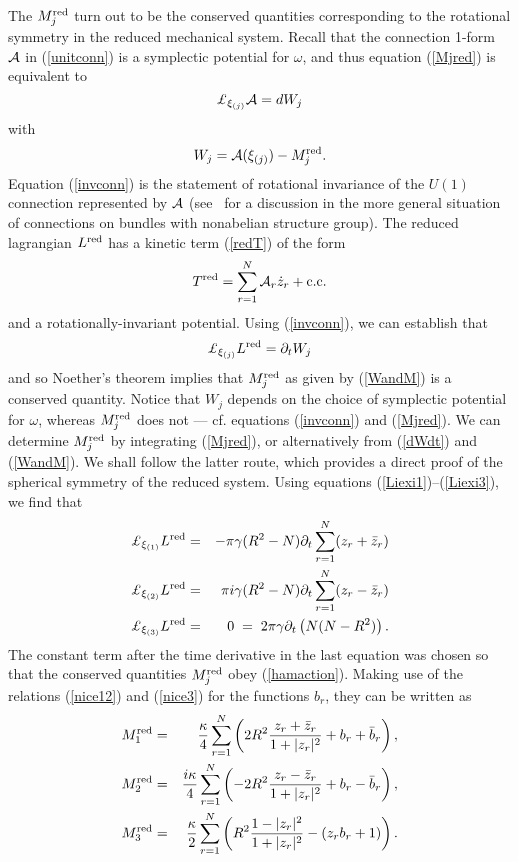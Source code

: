 \documentclass[a4paper,11pt]{article}
\begin{document}
The $M_{j}^{\rm red}$ turn out to be the conserved quantities
corresponding to the rotational symmetry in the reduced mechanical
system. Recall that the connection 1-form $\cal A$
in (\ref{unitconn}) is a symplectic potential for $\omega$, and thus
equation (\ref{Mjred}) is equivalent to 
\begin{equation}\label{invconn}
{\rm \pounds}_{\xi_{(j)}}{\cal A}=dW_{j}
\end{equation}
with
\begin{equation} \label{WandM}
W_{j}={\cal A}(\xi_{(j)})-M^{\rm red}_{j}.
\end{equation}
Equation (\ref{invconn}) is the statement of rotational invariance of
the $U(1)$ connection represented by ${\cal A}$
(see~\cite{JM} for a discussion
in the more general situation of connections on bundles with
nonabelian structure group). The reduced lagrangian $L^{\rm red}$ 
has a kinetic term (\ref{redT}) of the form
\[
T^{\rm red}=\sum_{r=1}^{N}{\cal A}_{r}\dot{z}_{r}+ {\rm c.c.}
\]
and a rotationally-invariant potential. Using (\ref{invconn}), we can
establish that
\begin{equation}\label{dWdt}
{\rm \pounds}_{\xi_{(j)}}L^{\rm red}=\partial_{t}W_{j}
\end{equation}
and so Noether's theorem implies that $M_{j}^{\rm red}$ as given by 
(\ref{WandM}) is a conserved quantity. Notice that
$W_{j}$ depends on the choice of symplectic potential for $\omega$, 
whereas $M_{j}^{\rm red}$ does not --- cf. equations (\ref{invconn}) 
and (\ref{Mjred}).
We can determine $M^{\rm red}_{j}$ 
by integrating (\ref{Mjred}), or alternatively from (\ref{dWdt}) 
and (\ref{WandM}). 
We shall follow the latter route, which provides a direct proof
of the spherical symmetry of the reduced system. Using equations
(\ref{Liexi1})--(\ref{Liexi3}),
we find that 
\begin{eqnarray*}
{\rm \pounds}_{\xi_{(1)}}L^{\rm red}&=& 
-\pi \gamma  (R^{2}-N)\partial_{t}\sum_{r=1}^{N}(z_{r}+\bar{z}_{r})\\
{\rm \pounds}_{\xi_{(2)}}L^{\rm red}&=&
\pi i \gamma
(R^{2}-N)\partial_{t}\sum_{r=1}^{N}(z_{r}-\bar{z}_{r})\\
{\rm \pounds}_{\xi_{(3)}}L^{\rm red}&=& 0 \;=\;2 \pi \gamma 
\partial_{t}\left( N(N-R^{2}) \right).
\end{eqnarray*}
The constant term after the time derivative in the last equation was
chosen so that the conserved quantities $M^{\rm red}_{j}$ obey
(\ref{hamaction}). Making use of the relations (\ref{nice12}) and
(\ref{nice3}) for the functions $b_{r}$, they
can be written as
\begin{eqnarray} 
M_{1}^{\rm red}&=&\frac{\kappa}{4}\sum_{r=1}^{N}\left(
2R^{2}\frac{z_{r}+\bar{z}_{r}}{1+|z_{r}|^{2}}+b_{r}+\bar{b}_{r}
\right), \label{simpM1red}\\
M_{2}^{\rm red}&=&\frac{i \kappa}{4}\sum_{r=1}^{N}\left(
-2R^{2}\frac{z_{r}-\bar{z}_{r}}{1+|z_{r}|^{2}}+b_{r}-\bar{b}_{r}
\right), \label{simpM2red}\\
M_{3}^{\rm red}&=&\frac{\kappa}{2}\sum_{r=1}^{N}\left(
R^{2}\frac{1-|z_{r}|^{2}}{1+|z_{r}|^{2}}-(z_{r}b_{r}+1)
\right). \label{simpM3red}
\end{eqnarray}
\end{document}

